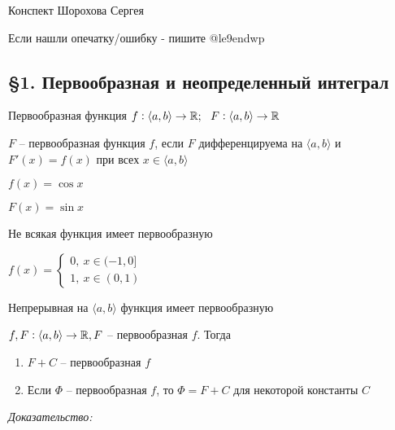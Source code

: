 \documentclass[12pt]{article}
\newcommand{\q}[1]{\langle #1 \rangle}
\begin{document}
\begin{flushright}
    Конспект Шорохова Сергея

    Если нашли опечатку/ошибку - пишите @le9endwp
\end{flushright}

\subsection*{\S 1. Первообразная и неопределенный интеграл}

\begin{defin}{Первообразная функция}
    $f : \q{a, b} \rightarrow \R;\ \ F: \q{a, b} \rightarrow \R$ 

    $F$ -- первообразная функция $f$, если $F$ дифференцируема на $\q{a, b}$ и $F'(x) = f(x)$ при всех $x \in \q{a, b}$

    \begin{Example}{}
        $f(x) = \cos{x}$

        $F(x) = \sin{x}$ 
    \end{Example}
\end{defin}

\begin{propos}{}
    Не всякая функция имеет первообразную

    \begin{Example}{}
        $f(x) = \begin{cases}
            0,\ x \in (-1, 0] \\
            1,\ x \in (0, 1)
        \end{cases}$
    \end{Example}
\end{propos}

\begin{propos}{}
    Непрерывная на $\q{a, b}$ функция имеет первообразную
\end{propos}

\begin{theo}{}
    $f, F : \q{a, b} \rightarrow \R, F$ -- первообразная $f$. Тогда

    \begin{enumerate}
        \item $F + C$ -- первообразная $f$
        \item Если $\Phi$ -- первообразная $f$, то $\Phi = F + C$ для некоторой константы $C$
    \end{enumerate}
\end{theo}

\textit{Доказательство:}
\end{document}
